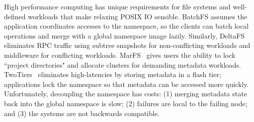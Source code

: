 
High performance computing has unique requirements for file systems and
well-defined workloads that make relaxing POSIX IO sensible.  BatchFS assumes
the application coordinates accesses to the namespace, so the clients can batch
local operations and merge with a global namespace image lazily. Similarly,
DeltaFS eliminates RPC traffic using subtree snapshots for non-conflicting
workloads and middleware for conflicting workloads.
MarFS~\cite{grider:pdsw2015-marfs} gives users the ability to lock ``project
directories" and allocate clusters for demanding metadata workloads.
TwoTiers~\cite{bent:slides-twotiers} eliminates high-latencies by storing
metadata in a flash tier; applications lock the namespace so that metadata can
be accessed more quickly.  Unfortunately, decoupling the namespace has costs:
(1) merging metadata state back into the global namespace is slow; (2) failures
are local to the failing node; and (3) the systems are not backwards
compatible.


